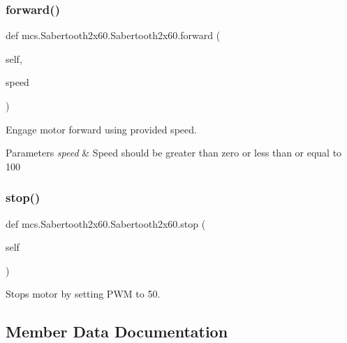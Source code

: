 \subsubsection{\texorpdfstring{forward()}{forward()}}
{\footnotesize\ttfamily def mcs.\+Sabertooth2x60.\+Sabertooth2x60.\+forward (\begin{DoxyParamCaption}\item[{}]{self,  }\item[{}]{speed }\end{DoxyParamCaption})}



Engage motor forward using provided speed. 


\begin{DoxyParams}{Parameters}
{\em speed} & Speed should be greater than zero or less than or equal to 100 \\
\hline
\end{DoxyParams}
\mbox{\label{classmcs_1_1Sabertooth2x60_1_1Sabertooth2x60_aef280facf9a0289a38b12075f4e66440}} 
\subsubsection{\texorpdfstring{stop()}{stop()}}
{\footnotesize\ttfamily def mcs.\+Sabertooth2x60.\+Sabertooth2x60.\+stop (\begin{DoxyParamCaption}\item[{}]{self }\end{DoxyParamCaption})}



Stops motor by setting P\+WM to 50. 



\subsection{Member Data Documentation}
\mbox{\label{classmcs_1_1Sabertooth2x60_1_1Sabertooth2x60_ab2a2769dcfc3d37e1b9c41592d854792}} 
